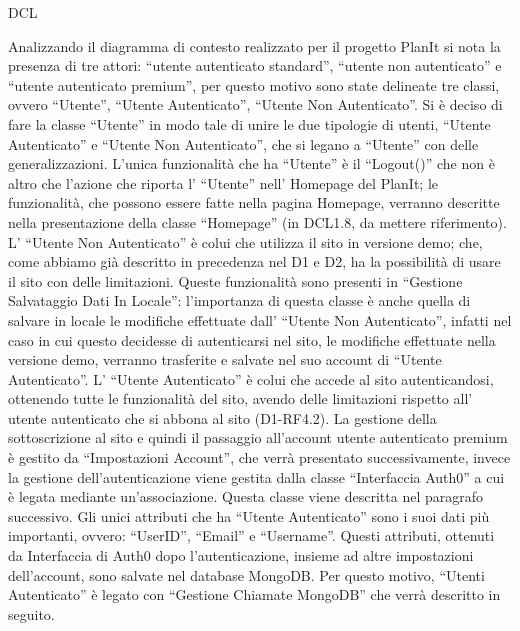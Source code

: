 \begin{listaPersonale}{DCL}

    Analizzando il diagramma di contesto realizzato per il progetto PlanIt si nota la presenza di tre attori: “utente autenticato standard”, “utente non autenticato” e “utente autenticato premium”, per questo motivo sono state delineate tre classi, ovvero “Utente”, “Utente Autenticato”, “Utente Non Autenticato”.
    Si è deciso di fare la classe “Utente” in modo tale di unire le due tipologie di utenti, “Utente Autenticato” e “Utente Non Autenticato”, che si legano a “Utente” con delle generalizzazioni. L'unica funzionalità che ha “Utente” è il “Logout()” che non è altro che l'azione che riporta l' “Utente” nell' Homepage del PlanIt; le funzionalità, che possono essere fatte nella pagina Homepage, verranno descritte nella presentazione della classe “Homepage” (in DCL1.8, da mettere riferimento).
    L' “Utente Non Autenticato” è colui che utilizza il sito in versione demo; che, come abbiamo già descritto in precedenza nel D1 e D2, ha la possibilità di usare il sito con delle limitazioni. Queste funzionalità sono presenti in “Gestione Salvataggio Dati In Locale”: l'importanza di questa classe è anche quella di salvare in locale le modifiche effettuate dall' “Utente Non Autenticato”, infatti nel caso in cui questo decidesse di autenticarsi nel sito, le modifiche effettuate nella versione demo, verranno trasferite e salvate nel suo account di “Utente Autenticato”.
    L' “Utente Autenticato” è colui che accede al sito autenticandosi, ottenendo tutte le funzionalità del sito, avendo delle limitazioni rispetto all' utente autenticato che si abbona al sito (D1-RF4.2). La gestione della sottoscrizione al sito e quindi il passaggio all'account utente autenticato premium è gestito da “Impostazioni Account”, che verrà presentato successivamente, invece la gestione dell'autenticazione viene gestita dalla classe “Interfaccia Auth0” a cui è legata mediante un'associazione. Questa classe viene descritta nel paragrafo successivo. Gli unici attributi che ha “Utente Autenticato” sono i suoi dati più importanti, ovvero: “UserID”, “Email” e “Username”. Questi attributi, ottenuti da Interfaccia di Auth0 dopo l'autenticazione, insieme ad altre impostazioni dell'account, sono salvate nel database MongoDB. Per questo motivo, “Utenti Autenticato” è legato con “Gestione Chiamate MongoDB” che verrà descritto in seguito.
    
    \begin{center}
        
    \end{center}
    

\end{listaPersonale}
